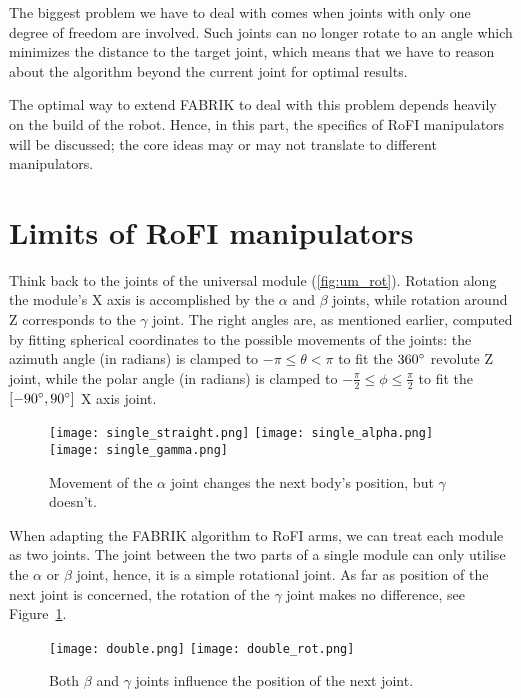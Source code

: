 The biggest problem we have to deal with comes when joints with only one degree of freedom are involved. Such joints can no longer rotate to an angle which minimizes the distance to the target joint, which means that we have to reason about the algorithm beyond the current joint for optimal results.

The optimal way to extend FABRIK to deal with this problem depends heavily on the build of the robot. Hence, in this part, the specifics of RoFI manipulators will be discussed; the core ideas may or may not translate to different manipulators.

\section{Limits of RoFI manipulators}

Think back to the joints of the universal module (\ref{fig:um_rot}). Rotation along the module's X axis is accomplished by the $\alpha$ and $\beta$ joints, while rotation around Z corresponds to the $\gamma$ joint. The right angles are, as mentioned earlier, computed by fitting spherical coordinates to the possible movements of the joints: the azimuth angle (in radians) is clamped to $-\pi \le \theta < \pi$ to fit the $360\degree$ revolute Z joint, while the polar angle (in radians) is clamped to $-\frac{\pi}{2} \le \phi \le \frac{\pi}{2}$ to fit the $\left[-90\degree, 90\degree\right]$ X axis joint.

\begin{figure}[ht]
  \centering
  \begin{minipage}{0.5\textwidth}
    \texttt{[image: single\_straight.png]}
    \texttt{[image: single\_alpha.png]}
    \texttt{[image: single\_gamma.png]}
  \end{minipage}
  \caption{Movement of the $\alpha$ joint changes the next body's position, but $\gamma$ doesn't.}\label{fig:module_rot}
\end{figure}

When adapting the FABRIK algorithm to RoFI arms, we can treat each module as two joints. The joint between the two parts of a single module can only utilise the $\alpha$ or $\beta$ joint, hence, it is a simple rotational joint. As far as position of the next joint is concerned, the rotation of the $\gamma$ joint makes no difference, see Figure~\ref{fig:module_rot}.

\begin{figure}[ht]
  \centering
  \begin{minipage}{0.4\textwidth}
    \texttt{[image: double.png]}
    \texttt{[image: double\_rot.png]}
  \end{minipage}
  \caption{Both $\beta$ and $\gamma$ joints influence the position of the next joint.}\label{fig:intermodule_rot}
\end{figure}

